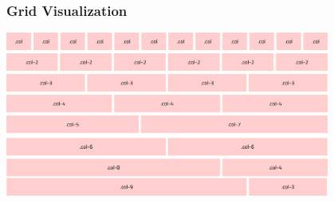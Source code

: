 \documentclass[aspectratio=169, table]{beamer}
\begin{document}
\begin{frame}
    \frametitle{Grid Visualization}
    \vskip1cm
    \begin{center}
	\includegraphics[width=0.8\textwidth]{classFiles/grid-custom.png}
    \end{center}
\end{frame}
\end{document}
